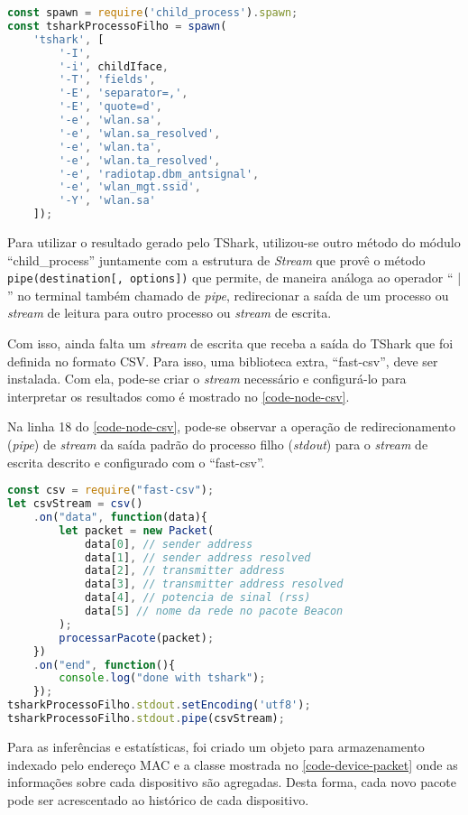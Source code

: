 \begin{lstlisting}[language=javascript,caption={TShark e opções executado pelo Node.js},label=code-node-tshark]
const spawn = require('child_process').spawn;
const tsharkProcessoFilho = spawn(
	'tshark', [
		'-I',
		'-i', childIface,
		'-T', 'fields',
		'-E', 'separator=,',
		'-E', 'quote=d',
		'-e', 'wlan.sa',
		'-e', 'wlan.sa_resolved',
		'-e', 'wlan.ta',
		'-e', 'wlan.ta_resolved',
		'-e', 'radiotap.dbm_antsignal',
		'-e', 'wlan_mgt.ssid',
		'-Y', 'wlan.sa'
	]);
\end{lstlisting}

Para utilizar o resultado gerado pelo TShark, utilizou-se outro método do módulo
``child\_process''  juntamente com a estrutura de \emph{Stream} \cite{stream}
que provê o método \texttt{pipe(destination[, options])} que permite, de maneira
análoga ao operador `` | '' no terminal também chamado de \emph{pipe},
redirecionar a saída de um processo ou \emph{stream} de leitura para outro
processo ou \emph{stream} de escrita.

Com isso, ainda falta um \emph{stream} de escrita que receba a saída do TShark
que foi definida no formato CSV. Para isso, uma biblioteca extra, ``fast-csv'',
deve ser instalada. Com ela, pode-se criar o \emph{stream} necessário e
configurá-lo para interpretar os resultados \cite{fast-csv} como é mostrado no
\autoref{code-node-csv}.

Na linha 18 do \autoref{code-node-csv}, pode-se observar a operação de
redirecionamento (\emph{pipe}) de \emph{stream} da saída padrão do processo
filho (\emph{stdout}) para o \emph{stream} de escrita descrito e configurado com
o ``fast-csv''.

\begin{lstlisting}[language=javascript,caption={Uso do fast-csv},label=code-node-csv]
const csv = require("fast-csv");
let csvStream = csv()
	.on("data", function(data){
		let packet = new Packet(
			data[0], // sender address
			data[1], // sender address resolved
			data[2], // transmitter address
			data[3], // transmitter address resolved
			data[4], // potencia de sinal (rss)
			data[5] // nome da rede no pacote Beacon
		);
		processarPacote(packet);
	})
	.on("end", function(){
		console.log("done with tshark");
	});
tsharkProcessoFilho.stdout.setEncoding('utf8');
tsharkProcessoFilho.stdout.pipe(csvStream);
\end{lstlisting}

Para as inferências e estatísticas, foi criado um objeto para armazenamento
indexado pelo endereço MAC e a classe mostrada no \autoref{code-device-packet}
onde as informações sobre cada dispositivo são agregadas. Desta forma, cada novo
pacote pode ser acrescentado ao histórico de cada dispositivo.

